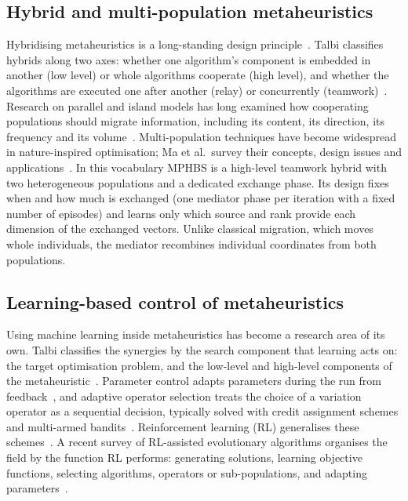 \documentclass[11pt]{article}
\theoremstyle{definition}
\theoremstyle{remark}
\begin{document}
\subsection{Hybrid and multi-population metaheuristics}
Hybridising metaheuristics is a long-standing design principle~\citep{talbi2002taxonomy,blum2011hybrid}. Talbi classifies
hybrids along two axes: whether one algorithm's component is embedded in another (low level) or whole algorithms
cooperate (high level), and whether the algorithms are executed one after another (relay) or concurrently
(teamwork)~\citep{talbi2002taxonomy}. Research on parallel and island models has long examined how cooperating
populations should migrate information, including its content, its direction, its frequency and its
volume~\citep{alba2002parallel}. Multi-population
techniques have become widespread in nature-inspired optimisation; Ma et al.\ survey their concepts, design issues and
applications~\citep{ma2019multipop}. In this vocabulary
MPHBS is a high-level teamwork hybrid with two heterogeneous populations and a dedicated exchange phase. Its design fixes
when and how much is exchanged (one mediator phase per iteration with a fixed number of episodes) and learns only which
source and rank provide each dimension of the exchanged vectors. Unlike classical migration, which moves whole
individuals, the mediator recombines individual coordinates from both populations.

\subsection{Learning-based control of metaheuristics}
Using machine learning inside metaheuristics has become a research area of its own. Talbi classifies the synergies by the
search component that learning acts on: the target optimisation problem, and the low-level and high-level components of
the metaheuristic~\citep{talbi2021ml}. Parameter control adapts parameters during the run from feedback~\citep{karafotias2015parameter},
and adaptive operator selection treats the choice of a variation operator as a sequential decision, typically solved with
credit assignment schemes and multi-armed bandits~\citep{fialho2010bandit}. Reinforcement learning (RL) generalises these
schemes~\citep{drugan2019rl}. A recent survey of RL-assisted evolutionary algorithms organises the field by the function RL
performs: generating solutions, learning objective functions, selecting algorithms, operators or sub-populations, and
adapting parameters~\citep{song2024rlea}.
\end{document}
